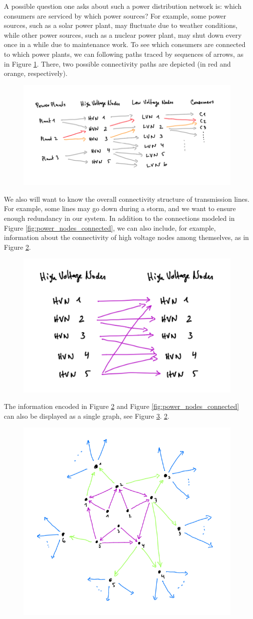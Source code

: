 A possible question one asks about such a power distribution network is: which consumers are serviced by which power sources? For example, some power sources, such as a solar power plant, may fluctuate due to weather conditions, while other power sources, such as a nuclear power plant, may shut down every once in a while due to maintenance work. To see which consumers are connected to which power plants, we can following paths traced by sequences of arrows, as in Figure \ref{fig:power_paths}. There, two possible connectivity paths are depicted (in red and orange, respectively).
\begin{figure}[h!]
\centering
 \includegraphics[width=0.7\linewidth]{pics/dist_net_4.png}
 \caption{}
\label{fig:power_paths}
\end{figure}
We also will want to know the overall connectivity structure of transmission lines. For example, some lines may go down during a storm, and we want to ensure enough redundancy in our system. In addition to the connections modeled in Figure \ref{fig:power_nodes_connected}, we can also include, for example, information about the connectivity of high voltage nodes among themselves, as in Figure \ref{fig:power_internodal}. 
\begin{figure}[h!]
\centering
 \includegraphics[width=0.5\linewidth]{pics/dist_net_3.png}
 \caption{}
\label{fig:power_internodal}
\end{figure}
The information encoded in Figure \ref{fig:power_internodal} and Figure \ref{fig:power_nodes_connected} can also be displayed as a single graph, see Figure \ref{fig:power_graph}.
\ref{fig:power_internodal}. 
\begin{figure}[h!]
\centering
 \includegraphics[width=0.5\linewidth]{pics/dist_net_6.png} 
 \caption{}
\label{fig:power_graph}
\end{figure}
